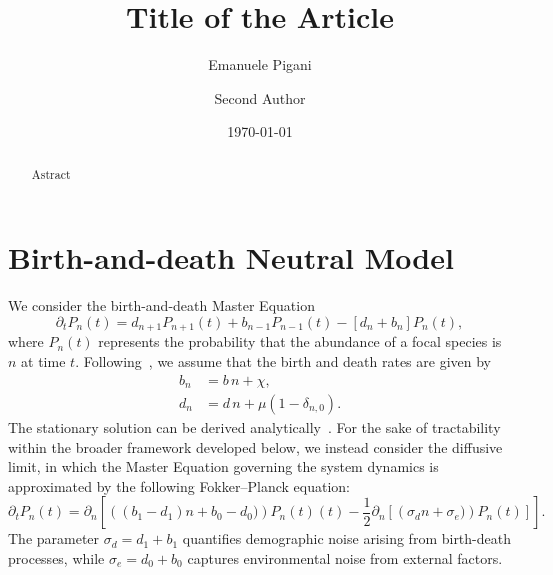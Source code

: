 \documentclass[%
 preprint,            %
 superscriptaddress, %
 amsmath,amssymb,    %
 aps,                %
 pra,                %
 floatfix,           %
]{revtex4-2}
\begin{document}
\title{Title of the Article}
\author{Emanuele Pigani}
\author{Second Author}

\date{\today}

\begin{abstract}
    Astract
\end{abstract}

\maketitle


\appendix

\section{Birth-and-death Neutral Model}

We consider the birth-and-death Master Equation
\begin{equation}
    \partial_t P_{n}(t) = d_{n+1} P_{n+1}(t) + b_{n-1} P_{n-1}(t) - [d_n + b_n] P_{n}(t),
    \label{eq:app:BD-ME}
\end{equation}
where $P_n(t)$ represents the probability that the abundance of a focal species is $n$ at time $t$. Following~\cite{he2005deriving, sergiacomi2018ubiquitous, pigani2024deviation}, we assume that the birth and death rates are given by 
\begin{align}
        b_n &= b\, n + \chi, \label{eq:app:BD-model-b}\\
        d_n &= d\, n + \mu \left(1-\delta_{n,0}\right). \label{eq:app:BD-model-d}
\end{align}
The stationary solution can be derived analytically~\cite{he2005deriving}. For the sake of tractability within the broader framework developed below, we instead consider the diffusive limit, in which the Master Equation governing the system dynamics is approximated by the following Fokker–Planck equation:
\begin{equation}
    \partial_t P_n(t) = \partial_n \left[\left((b_1-d_1)n + b_0 - d_0)\right) P_n(t)(t)
    - \frac{1}{2} \partial_n \left[\left(\sigma_d n + \sigma_e) \right)P_n(t)\right]
    \right].
\end{equation}
The parameter $\sigma_d = d_1 + b_1$ quantifies demographic noise arising from birth-death processes, while $\sigma_e = d_0 + b_0$ captures environmental noise from external factors. 
\end{document}
